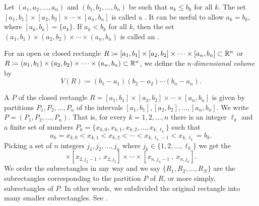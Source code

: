 \begin{defn}
Let $(a_1,a_2,\ldots,a_n)$ and
$(b_1,b_2,\ldots,b_n)$ be such that $a_k \leq b_k$ for all $k$.
The set
$[a_1,b_1] \times
[a_2,b_2] \times \cdots \times
[a_n,b_n]$ is called a \emph{}.
It can be useful to allow $a_k = b_k$, where
$[a_k,b_k] = \{ a_k \}$.
If $a_k < b_k$ for all $k$, then the set
$(a_1,b_1) \times
(a_2,b_2) \times \cdots \times
(a_n,b_n)$ is called an \emph{}.

For an open or closed rectangle
$R \coloneqq [a_1,b_1] \times
[a_2,b_2] \times \cdots \times
[a_n,b_n] \subset {\mathbb{R}}^n$
or
$R \coloneqq (a_1,b_1) \times
(a_2,b_2) \times \cdots \times
(a_n,b_n) \subset {\mathbb{R}}^n$,
we define the
\emph{$n$-dimensional volume}%
%
 by
\begin{equation*}
V(R) \coloneqq
(b_1-a_1)
(b_2-a_2)
\cdots
(b_n-a_n) .
\end{equation*}

A \emph{} $P$ of the closed rectangle
$R = [a_1,b_1] \times
[a_2,b_2] \times \cdots \times
[a_n,b_n]$
is given by
partitions $P_1,P_2,\ldots,P_n$ of the intervals
$[a_1,b_1], [a_2,b_2],\ldots, [a_n,b_n]$.
We write $P=(P_1,P_2,\ldots,P_n)$.
That is, for every $k=1,2,\ldots,n$ there is an integer $\ell_k$ and
a finite set of numbers
$P_k = \{ x_{k,0},x_{k,1},x_{k,2},\ldots,x_{k,\ell_k} \}$ such that
\begin{equation*}
a_k = x_{k,0} < x_{k,1} < x_{k,2} < \cdots < x_{k,{\ell_k}-1} < x_{k,\ell_k} = b_k .
\end{equation*}
Picking a set of $n$ integers $j_1,j_2,\ldots,j_n$ where
$j_k \in \{ 1,2,\ldots,\ell_k \}$ we get
the
\emph{}
\begin{equation*}
[x_{1,j_1-1}~,~ x_{1,j_1}]
\times
[x_{2,j_2-1}~,~ x_{2,j_2}]
\times
\cdots
\times
[x_{n,j_n-1}~,~ x_{n,j_n}] .
\end{equation*}
We order the subrectangles in any way and
we say $\{R_1,R_2,\ldots,R_N\}$ are the subrectangles corresponding
to the partition $P$ of $R$, or more simply, subrectangles of
$P$.
In other words, we subdivided the original rectangle into many smaller
subrectangles.  See .

\begin{myfigureht}
\caption{Example partition of a rectangle in $\R^2$.  The order of the
subrectangles is not important.\label{mv:figrect}}
\end{myfigureht}


\end{defn}
